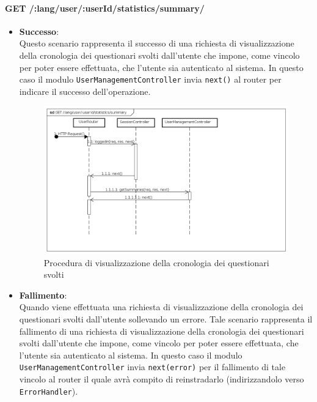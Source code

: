\paragraph{GET /:lang/user/:userId/statistics/summary/}
\begin{itemize}
\item \textbf{Successo}:
\\
Questo scenario rappresenta il successo di una richiesta di visualizzazione della cronologia dei questionari svolti dall'utente che impone, come vincolo per poter essere effettuata, che l'utente sia autenticato al sistema.  
In questo caso il modulo \texttt{UserManagementController} invia \texttt{next()} al router per indicare il successo dell'operazione.
\label{Procedura di visualizzazione della cronologia dei questionari svolti}
\begin{figure}[ht]
	\centering
	\includegraphics[scale=0.40]{UML/DiagrammiDiSequenza/Back-end/GET_LangUserUserIdStatisticsSummarySuccess.png}
	\caption{Procedura di visualizzazione della cronologia dei questionari svolti}
\end{figure}
\FloatBarrier
\item \textbf{Fallimento}:
\\
Quando viene effettuata una richiesta di visualizzazione della cronologia dei questionari svolti dall'utente sollevando un errore. Tale scenario rappresenta il fallimento di una richiesta di visualizzazione della cronologia dei questionari svolti dall'utente che impone, come vincolo per poter essere effettuata, che l'utente sia autenticato al sistema. In questo caso il modulo \texttt{UserManagementController} invia \texttt{next(error)} per il fallimento di tale vincolo al router il quale avrà compito di reinstradarlo (indirizzandolo verso \texttt{ErrorHandler}).
\label{Fallimento della procedura di visualizzazione della cronologia dei questionari svolti}

\end{itemize}
